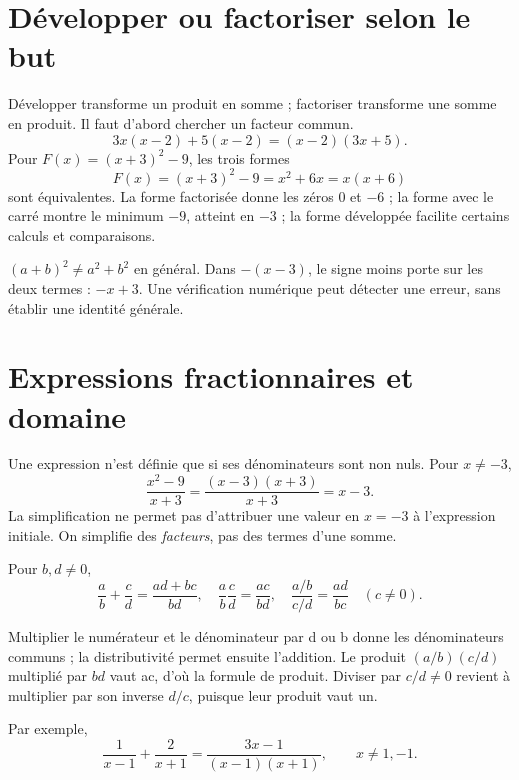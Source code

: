 \documentclass[../cours_2de.tex]{subfiles}
\begin{document}
\section{Développer ou factoriser selon le but}
Développer transforme un produit en somme ; factoriser transforme une somme en produit. Il faut d'abord chercher un facteur commun.
\[
3x(x-2)+5(x-2)=(x-2)(3x+5).
\]
Pour $F(x)=(x+3)^2-9$, les trois formes
\[
F(x)=(x+3)^2-9=x^2+6x=x(x+6)
\]
sont équivalentes. La forme factorisée donne les zéros $0$ et $-6$ ; la forme avec le carré montre le minimum $-9$, atteint en $-3$ ; la forme développée facilite certains calculs et comparaisons.
\begin{attention}
$(a+b)^2\ne a^2+b^2$ en général. Dans $-(x-3)$, le signe moins porte sur les deux termes : $-x+3$. Une vérification numérique peut détecter une erreur, sans établir une identité générale.
\end{attention}
\section{Expressions fractionnaires et domaine}
Une expression n'est définie que si ses dénominateurs sont non nuls. Pour $x\ne-3$,
\[
\frac{x^2-9}{x+3}=\frac{(x-3)(x+3)}{x+3}=x-3.
\]
La simplification ne permet pas d'attribuer une valeur en $x=-3$ à l'expression initiale. On simplifie des \emph{facteurs}, pas des termes d'une somme.

Pour $b,d\ne0$,
\[
\frac ab+\frac cd=\frac{ad+bc}{bd},\quad
\frac ab\frac cd=\frac{ac}{bd},\quad
\frac{a/b}{c/d}=\frac{ad}{bc}\quad(c\ne0).
\]
\begin{demonstration}
Multiplier le numérateur et le dénominateur par d ou b donne les dénominateurs communs ; la distributivité permet ensuite l'addition. Le produit $(a/b)(c/d)$ multiplié par $bd$ vaut ac, d'où la formule de produit. Diviser par $c/d\ne0$ revient à multiplier par son inverse $d/c$, puisque leur produit vaut un.
\end{demonstration}
Par exemple,
\[
\frac1{x-1}+\frac2{x+1}=\frac{3x-1}{(x-1)(x+1)},\qquad x\ne1,-1.
\]
\end{document}
